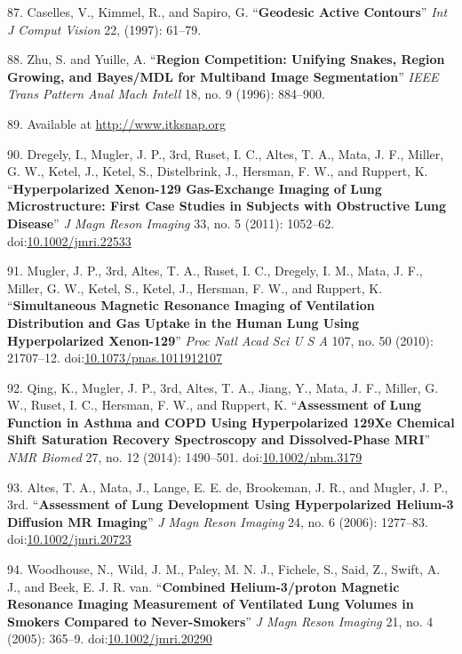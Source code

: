 \documentclass[11pt,]{article}
\begin{document}
\hypertarget{ref-Caselles:1997aa}{}
87. Caselles, V., Kimmel, R., and Sapiro, G. ``\textbf{Geodesic Active
Contours}'' \emph{Int J Comput Vision} 22, (1997): 61--79.

\hypertarget{ref-Zhu:1996aa}{}
88. Zhu, S. and Yuille, A. ``\textbf{Region Competition: Unifying
Snakes, Region Growing, and Bayes/MDL for Multiband Image
Segmentation}'' \emph{IEEE Trans Pattern Anal Mach Intell} 18, no. 9
(1996): 884--900.

\hypertarget{ref-SnapWebsite}{}
89. Available at \url{http://www.itksnap.org}

\hypertarget{ref-Dregely:2011aa}{}
90. Dregely, I., Mugler, J. P., 3rd, Ruset, I. C., Altes, T. A., Mata,
J. F., Miller, G. W., Ketel, J., Ketel, S., Distelbrink, J., Hersman, F.
W., and Ruppert, K. ``\textbf{Hyperpolarized Xenon-129 Gas-Exchange
Imaging of Lung Microstructure: First Case Studies in Subjects with
Obstructive Lung Disease}'' \emph{J Magn Reson Imaging} 33, no. 5
(2011): 1052--62.
doi:\href{https://doi.org/10.1002/jmri.22533}{10.1002/jmri.22533}

\hypertarget{ref-Mugler:2010aa}{}
91. Mugler, J. P., 3rd, Altes, T. A., Ruset, I. C., Dregely, I. M.,
Mata, J. F., Miller, G. W., Ketel, S., Ketel, J., Hersman, F. W., and
Ruppert, K. ``\textbf{Simultaneous Magnetic Resonance Imaging of
Ventilation Distribution and Gas Uptake in the Human Lung Using
Hyperpolarized Xenon-129}'' \emph{Proc Natl Acad Sci U S A} 107, no. 50
(2010): 21707--12.
doi:\href{https://doi.org/10.1073/pnas.1011912107}{10.1073/pnas.1011912107}

\hypertarget{ref-Qing:2014ab}{}
92. Qing, K., Mugler, J. P., 3rd, Altes, T. A., Jiang, Y., Mata, J. F.,
Miller, G. W., Ruset, I. C., Hersman, F. W., and Ruppert, K.
``\textbf{Assessment of Lung Function in Asthma and COPD Using
Hyperpolarized 129Xe Chemical Shift Saturation Recovery Spectroscopy and
Dissolved-Phase MRI}'' \emph{NMR Biomed} 27, no. 12 (2014): 1490--501.
doi:\href{https://doi.org/10.1002/nbm.3179}{10.1002/nbm.3179}

\hypertarget{ref-Altes:2006aa}{}
93. Altes, T. A., Mata, J., Lange, E. E. de, Brookeman, J. R., and
Mugler, J. P., 3rd. ``\textbf{Assessment of Lung Development Using
Hyperpolarized Helium-3 Diffusion MR Imaging}'' \emph{J Magn Reson
Imaging} 24, no. 6 (2006): 1277--83.
doi:\href{https://doi.org/10.1002/jmri.20723}{10.1002/jmri.20723}

\hypertarget{ref-Woodhouse:2005aa}{}
94. Woodhouse, N., Wild, J. M., Paley, M. N. J., Fichele, S., Said, Z.,
Swift, A. J., and Beek, E. J. R. van. ``\textbf{Combined Helium-3/proton
Magnetic Resonance Imaging Measurement of Ventilated Lung Volumes in
Smokers Compared to Never-Smokers}'' \emph{J Magn Reson Imaging} 21, no.
4 (2005): 365--9.
doi:\href{https://doi.org/10.1002/jmri.20290}{10.1002/jmri.20290}
\end{document}
